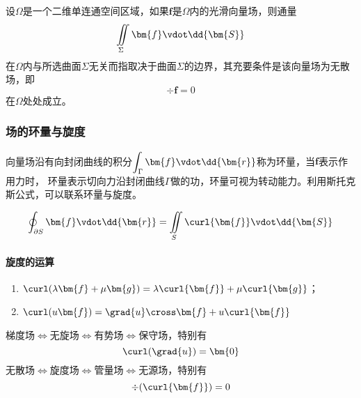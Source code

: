 \begin{theorem}
    设$\Omega$是一个二维单连通空间区域，如果$\bm{f}$是$\Omega$内的光滑向量场，则通量
    \[ \iint\limits_\Sigma \bm{f}\vdot\dd{\bm{S}} \]
    在$\Omega$内与所选曲面$\Sigma$无关而指取决于曲面$\Sigma$的边界，其充要条件是该向量场为无散场，即
    \[ \div{\bm{f}} = 0 \]
    在$\Omega$处处成立。
\end{theorem}


\subsubsection{场的环量与旋度}
向量场沿有向封闭曲线的积分$\displaystyle\int_\Gamma \bm{f}\vdot\dd{\bm{r}}$称为环量，当$\bm{f}$表示作用力时，
环量表示切向力沿封闭曲线$\Gamma$做的功，环量可视为转动能力。利用斯托克斯公式，可以联系环量与旋度。

\[ \oint_{\partial S}\bm{f}\vdot\dd{\bm{r}} = \iint\limits_S \curl{\bm{f}}\vdot\dd{\bm{S}} \]

\paragraph{旋度的运算}
\begin{enumerate}[(1)]
    \item $\curl(\lambda\bm{f}+\mu\bm{g})=\lambda\curl{\bm{f}} + \mu\curl{\bm{g}}$；
    \item $\curl(u\bm{f})=\grad{u}\cross\bm{f} + u\curl{\bm{f}}$
\end{enumerate}

梯度场$\iff$无旋场$\iff$有势场$\iff$保守场，特别有
\[ \curl(\grad{u}) = \bm{0} \]
无散场$\iff$旋度场$\iff$管量场$\iff$无源场，特别有
\[ \div(\curl{\bm{f}}) = 0 \]